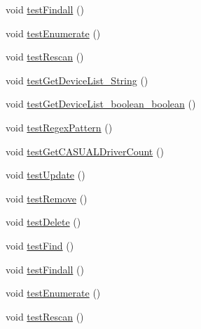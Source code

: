 \begin{DoxyCompactItemize}
\item 
void \hyperlink{class_c_a_s_u_a_l_1_1communicationstools_1_1heimdall_1_1drivers_1_1_driver_operations_test_a506c0f40d8ea1cc33171cd96ecf9bb68}{test\-Findall} ()
\item 
void \hyperlink{class_c_a_s_u_a_l_1_1communicationstools_1_1heimdall_1_1drivers_1_1_driver_operations_test_a87bdeb41f860f58228261357feaef31b}{test\-Enumerate} ()
\item 
void \hyperlink{class_c_a_s_u_a_l_1_1communicationstools_1_1heimdall_1_1drivers_1_1_driver_operations_test_aa9a89b225647938c4437215f9574b36f}{test\-Rescan} ()
\item 
void \hyperlink{class_c_a_s_u_a_l_1_1communicationstools_1_1heimdall_1_1drivers_1_1_driver_operations_test_ac065acc83e4fe82ab992b79e25e5f97b}{test\-Get\-Device\-List\-\_\-\-String} ()
\item 
void \hyperlink{class_c_a_s_u_a_l_1_1communicationstools_1_1heimdall_1_1drivers_1_1_driver_operations_test_a36fc1e429fd4658fb4071ed84b9f291d}{test\-Get\-Device\-List\-\_\-boolean\-\_\-boolean} ()
\item 
void \hyperlink{class_c_a_s_u_a_l_1_1communicationstools_1_1heimdall_1_1drivers_1_1_driver_operations_test_a0dfeed938665700eecf1498420167622}{test\-Regex\-Pattern} ()
\item 
void \hyperlink{class_c_a_s_u_a_l_1_1communicationstools_1_1heimdall_1_1drivers_1_1_driver_operations_test_ab3003bfda57d6facc1296537657660f5}{test\-Get\-C\-A\-S\-U\-A\-L\-Driver\-Count} ()
\item 
void \hyperlink{class_c_a_s_u_a_l_1_1communicationstools_1_1heimdall_1_1drivers_1_1_driver_operations_test_a389a3075b6ec69b616fe05110cff6c5b}{test\-Update} ()
\item 
void \hyperlink{class_c_a_s_u_a_l_1_1communicationstools_1_1heimdall_1_1drivers_1_1_driver_operations_test_a8edd65233384964d8681dbe243efab59}{test\-Remove} ()
\item 
void \hyperlink{class_c_a_s_u_a_l_1_1communicationstools_1_1heimdall_1_1drivers_1_1_driver_operations_test_a770044da7eeb6873e7f239ff97af09db}{test\-Delete} ()
\item 
void \hyperlink{class_c_a_s_u_a_l_1_1communicationstools_1_1heimdall_1_1drivers_1_1_driver_operations_test_af04773e9a25ed70ef56e8298a07ecfd9}{test\-Find} ()
\item 
void \hyperlink{class_c_a_s_u_a_l_1_1communicationstools_1_1heimdall_1_1drivers_1_1_driver_operations_test_a506c0f40d8ea1cc33171cd96ecf9bb68}{test\-Findall} ()
\item 
void \hyperlink{class_c_a_s_u_a_l_1_1communicationstools_1_1heimdall_1_1drivers_1_1_driver_operations_test_a87bdeb41f860f58228261357feaef31b}{test\-Enumerate} ()
\item 
void \hyperlink{class_c_a_s_u_a_l_1_1communicationstools_1_1heimdall_1_1drivers_1_1_driver_operations_test_aa9a89b225647938c4437215f9574b36f}{test\-Rescan} ()
\end{DoxyCompactItemize}


